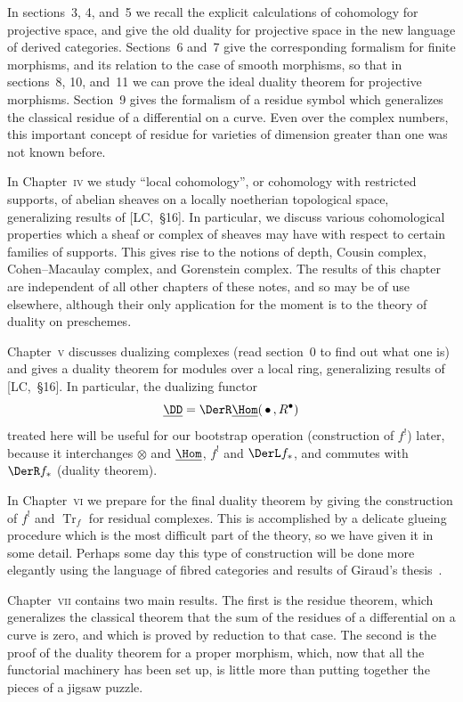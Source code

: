 In sections~3, 4, and~5 we recall the explicit calculations of cohomology for projective space, and give the old duality for projective space in the new language of derived categories. Sections~6 and~7 give the corresponding formalism for finite morphisms, and its relation to the case of smooth morphisms, so that in sections~8, 10, and~11 we can prove the ideal duality theorem for projective morphisms. Section~9 gives the formalism of a residue symbol which generalizes the classical residue of a differential on a curve. Even over the complex numbers, this important concept of residue for varieties of dimension greater than one was not known before.

In Chapter~\textsc{iv} we study ``local cohomology'', or cohomology with restricted supports, of abelian sheaves on a locally noetherian topological space, generalizing results of [LC,~\S16]. In particular, we discuss various cohomological properties which a sheaf or complex of sheaves may have with respect to certain families of supports. This gives rise to the notions of depth, Cousin complex, Cohen–Macaulay complex, and Gorenstein complex. The results of this chapter are independent of all other chapters of these notes, and so may be of use elsewhere, although their only application for the moment is to the theory of duality on preschemes.

Chapter~\textsc{v} discusses dualizing complexes (read section~0 to find out what one is) and gives a duality theorem for modules over a local ring, generalizing results of [LC,~\S16]. In particular, the dualizing functor
\[
\underline{\DD} = \DerR\underline{\Hom}(\,\bullet\,, R^{\bullet})
\]
treated here will be useful for our bootstrap operation (construction of $f^{!}$) later, because it interchanges $\otimes$ and $\underline{\Hom}$, $f^{!}$ and $\DerL f_{*}$, and commutes with $\DerR f_{*}$ (duality theorem).

In Chapter~\textsc{vi} we prepare for the final duality theorem by giving the construction of $f^{!}$ and $\operatorname{Tr}_{f}$ for residual complexes. This is accomplished by a delicate glueing procedure which is the most difficult part of the theory, so we have given it in some detail. Perhaps some day this type of construction will be done more elegantly using the language of fibred categories and results of Giraud's thesis~\cite{6}.

Chapter~\textsc{vii} contains two main results. The first is the residue theorem, which generalizes the classical theorem that the sum of the residues of a differential on a curve is zero, and which is proved by reduction to that case. The second is the proof of the duality theorem for a proper morphism, which, now that all the functorial machinery has been set up, is little more than putting together the pieces of a jigsaw puzzle.

